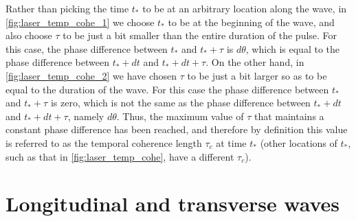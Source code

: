 \documentclass[a4paper,11pt]{report}
\begin{document}
Rather than picking the time $t_*$ to be at an arbitrary location along the wave, in \cref{fig:laser_temp_cohe_1} we choose $t_*$ to be at the beginning of the wave, and also choose $\tau$ to be just a bit smaller than the entire duration of the pulse. For this case, the phase difference between $t_*$ and $t_*+\tau$ is $d\theta$, which is equal to the phase difference between $t_*+dt$ and $t_*+dt+\tau$. On the other hand, in \cref{fig:laser_temp_cohe_2} we have chosen $\tau$ to be just a bit larger so as to be equal to the duration of the wave. For this case the phase difference between $t_*$ and $t_*+\tau$ is zero, which is not the same as the phase difference between $t_*+dt$ and $t_*+dt+\tau$, namely $d\theta$. Thus, the maximum value of $\tau$ that maintains a constant phase difference has been reached, and therefore by definition this value is referred to as the temporal coherence length $\tau_c$ at time $t_*$ (other locations of $t_*$, such as that in \cref{fig:laser_temp_cohe}, have a different $\tau_c$).

\chapter{Longitudinal and transverse waves}

\end{document}
